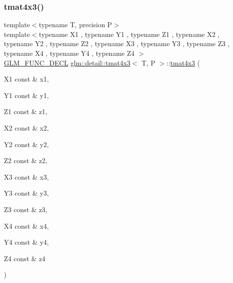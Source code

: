 \subsubsection{\texorpdfstring{tmat4x3()}{tmat4x3()}\hspace{0.1cm}{\footnotesize\ttfamily [8/22]}}
{\footnotesize\ttfamily template$<$typename T, precision P$>$ \\
template$<$typename X1 , typename Y1 , typename Z1 , typename X2 , typename Y2 , typename Z2 , typename X3 , typename Y3 , typename Z3 , typename X4 , typename Y4 , typename Z4 $>$ \\
\hyperlink{setup_8hpp_ab2d052de21a70539923e9bcbf6e83a51}{G\+L\+M\+\_\+\+F\+U\+N\+C\+\_\+\+D\+E\+CL} \hyperlink{structglm_1_1detail_1_1tmat4x3}{glm\+::detail\+::tmat4x3}$<$ T, P $>$\+::\hyperlink{structglm_1_1detail_1_1tmat4x3}{tmat4x3} (\begin{DoxyParamCaption}\item[{X1 const \&}]{x1,  }\item[{Y1 const \&}]{y1,  }\item[{Z1 const \&}]{z1,  }\item[{X2 const \&}]{x2,  }\item[{Y2 const \&}]{y2,  }\item[{Z2 const \&}]{z2,  }\item[{X3 const \&}]{x3,  }\item[{Y3 const \&}]{y3,  }\item[{Z3 const \&}]{z3,  }\item[{X4 const \&}]{x4,  }\item[{Y4 const \&}]{y4,  }\item[{Z4 const \&}]{z4 }\end{DoxyParamCaption})}

\mbox{\label{structglm_1_1detail_1_1tmat4x3_a8ef04c1736662e7373db390d7351114f}} 
